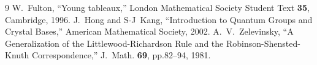 \documentclass[a4paper,twocolumn]{report}
\begin{document}
\begin{thebibliography}{9}
     W.~Fulton, ``Young tableaux,'' London Mathematical Society Student Text {\bf 35}, Cambridge, 1996.
     J.~Hong and S-J~Kang, ``Introduction to Quantum Groups and Crystal Bases,'' American Mathematical Society, 2002.
     A.~V.~Zelevinsky, ``A Generalization of the Littlewood-Richardson Rule and the Robinson-Shensted-Knuth Correspondence,'' J.~Math. {\bf 69}, pp.82--94, 1981.
\end{thebibliography}

\end{document}
